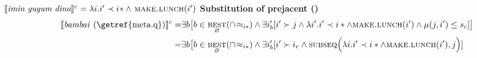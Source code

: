 $\denote[c]{\textit{imin gugum dina}}=\lambda i.i'\prec i\!*\wedge\ \textsc{make.lunch}(i')$
\a \textbf{Substitution of prejacent ()}
\begin{align*}
 	\denote[c]{\textit{bambai \textup{(\getref{meta.q})}}}=&\exists b\big[b\in\underset{\varnothing}{\textsc{best}}(\cap\!\approx_{i*})\wedge \exists i'_b[i'\succ j\wedge \lambda i'.i'\prec i*\wedge\textsc{make.lunch}(i')\wedge\mu(j,i')\leq s_c]\big]\\
	=&\exists b\big[b\in\underset{\varnothing}{\textsc{best}}(\cap\!\approx_{i*})\wedge \exists i'_b[i'\succ i_r\wedge \textsc{subseq}\Big(\lambda i.i'\prec i*\wedge\textsc{make.lunch}(i'),j\Big)]
\end{align*}

%
%


%


